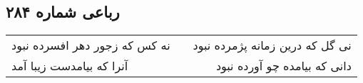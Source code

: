 \begin{center}
\section*{رباعی شماره ۲۸۴}
\label{sec:sh284}
\begin{longtable}{l p{0.5cm} r}
نه کس که زجور دهر افسرده نبود
&&
نی گل که درین زمانه پژمرده نبود
\\
آنرا که بیامدست زیبا آمد
&&
دانی که بیامده چو آورده نبود
\\
\end{longtable}
\end{center}
